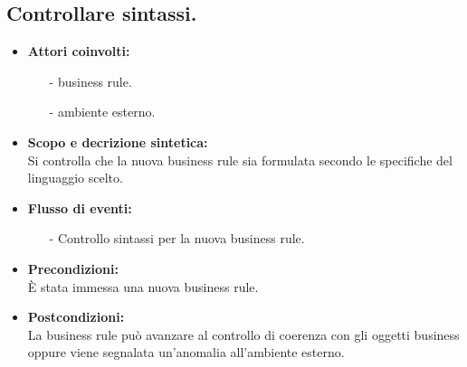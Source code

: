 \documentclass[11pt,titlepage,a4paper]{report}
\begin{document}
\subsection{Controllare sintassi.}
\begin{itemize}
\item{\textbf{Attori coinvolti:}}
\begin{itemize}
\item[-] business rule.
\item[-] ambiente esterno.
\end{itemize}
\item{\textbf{Scopo e decrizione sintetica:}}\\
Si controlla che la nuova business rule sia formulata secondo le specifiche del linguaggio scelto.
\item{\textbf{Flusso di eventi:}}
\begin{itemize}
 \item[-] Controllo sintassi per la nuova business rule.
\end{itemize}
\item{\textbf{Precondizioni:}}\\
\`E stata immessa una nuova business rule.
\item{\textbf{Postcondizioni:}}\\
La business rule pu\`o avanzare al controllo di coerenza con gli oggetti business oppure viene segnalata un'anomalia all'ambiente esterno.

\end{itemize}
\end{document}

